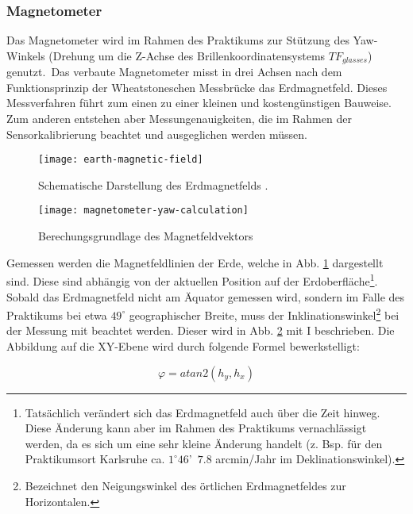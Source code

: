 \subsubsection{Magnetometer}
\label{headtracking_magnetometer_subsubsec}

Das Magnetometer wird im Rahmen des Praktikums zur Stützung des Yaw-Winkels (Drehung um die Z-Achse des Brillenkoordinatensystems $TF_{glasses}$) genutzt.\
Das verbaute Magnetometer misst in drei Achsen nach dem Funktionsprinzip der Wheatstoneschen Messbrücke \cite{renaudin2010complete} das Erdmagnetfeld.
Dieses Messverfahren führt zum einen zu einer kleinen und kostengünstigen Bauweise.
Zum anderen entstehen aber Messungenauigkeiten, die im Rahmen der Sensorkalibrierung beachtet und ausgeglichen werden müssen.

\begin{figure}[h]
   \centering
   \texttt{[image: earth-magnetic-field]}
   \caption[mag_world]{Schematische Darstellung des Erdmagnetfelds \cite{mag_world_source}.}
   \label{fig:mag_world}
\end{figure}

\begin{figure}[h]
   \centering
   \texttt{[image: magnetometer-yaw-calculation]}
   \caption[mag_mapping]{Berechungsgrundlage des Magnetfeldvektors}
   \label{fig:mag_mapping}
\end{figure}

Gemessen werden die Magnetfeldlinien der Erde, welche in Abb. \ref{fig:mag_world} dargestellt sind.
Diese sind abhängig von der aktuellen Position auf der Erdoberfläche\footnote{Tatsächlich verändert sich das Erdmagnetfeld auch über die Zeit hinweg.
Diese Änderung kann aber im Rahmen des Praktikums vernachlässigt werden, da es sich um eine sehr kleine Änderung handelt (z. Bsp. für den Praktikumsort Karlsruhe ca. $1^\circ 46$'~$7.8$ arcmin/Jahr im Deklinationswinkel).}.
Sobald das Erdmagnetfeld nicht am Äquator gemessen wird, sondern im Falle des Praktikums bei etwa $49^\circ$ geographischer Breite, muss der Inklinationswinkel\footnote{Bezeichnet den Neigungswinkel des örtlichen Erdmagnetfeldes zur Horizontalen.} bei der Messung mit beachtet werden.
Dieser wird in Abb. \ref{fig:mag_mapping} mit I beschrieben.
Die Abbildung auf die XY-Ebene wird durch folgende Formel bewerkstelligt:

\begin{equation}
    \varphi = atan2(h_y,h_x)
\end{equation}

